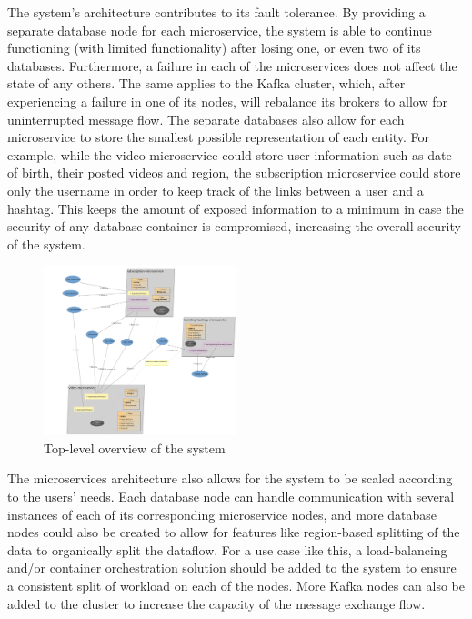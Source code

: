 \documentclass[parskip=full]{article}
\begin{document}
    The system's architecture contributes to its fault tolerance.
    By providing a separate database node for each microservice, the system is able to continue functioning (with limited functionality) after losing one, or even two of its databases.
    Furthermore, a failure in each of the microservices does not affect the state of any others.
    The same applies to the Kafka cluster, which, after experiencing a failure in one of its nodes, will rebalance its brokers to allow for uninterrupted message flow.
    The separate databases also allow for each microservice to store the smallest possible representation of each entity.
    For example, while the video microservice could store user information such as date of birth, their posted videos and region, the subscription microservice could store only the username in order to keep track of the links between a user and a hashtag.
    This keeps the amount of exposed information to a minimum in case the security of any database container is compromised, increasing the overall security of the system.

    \begin{figure}
        \includegraphics[width=0.5\textwidth]{video-platform-top-level-sirius}
        \caption{Top-level overview of the system}
        \label{fig:siriusSystemOverview}
    \end{figure}

    The microservices architecture also allows for the system to be scaled according to the users' needs.
    Each database node can handle communication with several instances of each of its corresponding microservice nodes, and more database nodes could also be created to allow for features like region-based splitting of the data to organically split the dataflow.
    For a use case like this, a load-balancing and/or container orchestration solution should be added to the system to ensure a consistent split of workload on each of the nodes.
    More Kafka nodes can also be added to the cluster to increase the capacity of the message exchange flow.
\end{document}
